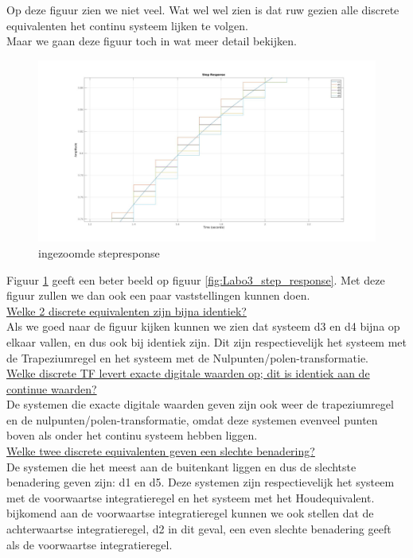 \documentclass[a4paper, 12pt]{article}
\begin{document}
Op deze figuur zien we niet veel. Wat wel wel zien is dat ruw gezien alle discrete equivalenten het continu systeem lijken te volgen.\\
Maar we gaan deze figuur toch in wat meer detail bekijken.

\begin{figure}[H]
	\includegraphics[width=1\linewidth]{Labo3_step_response2.jpg}
	\caption{ingezoomde stepresponse}
	\label{fig:Labo3_step_response_zoom}
\end{figure}

Figuur \ref{fig:Labo3_step_response_zoom} geeft een beter beeld op figuur \ref{fig:Labo3_step_response}. Met deze figuur zullen we dan ook een paar vaststellingen kunnen doen. \\

\underline{Welke 2 discrete equivalenten zijn bijna identiek?}\\
Als we goed naar de figuur kijken kunnen we zien dat systeem d3 en d4 bijna op elkaar vallen, en dus ook bij identiek zijn. Dit zijn respectievelijk het systeem met de Trapeziumregel en het systeem met de Nulpunten/polen-transformatie.\\

\underline{Welke discrete TF levert exacte digitale waarden op; dit is identiek aan de continue waarden?}\\
De systemen die exacte digitale waarden geven zijn ook weer de trapeziumregel en de nulpunten/polen-transformatie, omdat deze systemen evenveel punten boven als onder het continu systeem hebben liggen.\\

\underline{Welke twee discrete equivalenten geven een slechte benadering?}\\
De systemen die het meest aan de buitenkant liggen en dus de slechtste benadering geven zijn: d1 en d5. Deze systemen zijn respectievelijk het systeem met de voorwaartse integratieregel en het systeem met het Houdequivalent. bijkomend aan de voorwaartse integratieregel kunnen we ook stellen dat de achterwaartse integratieregel, d2 in dit geval, een even slechte benadering geeft als de voorwaartse integratieregel. \\
\end{document}
